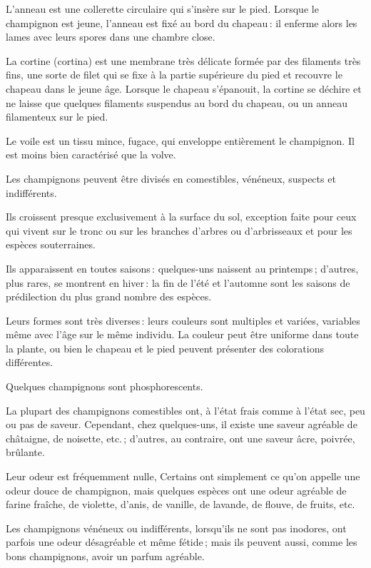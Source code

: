 L'anneau est une collerette circulaire qui s'insère sur le pied. Lorsque le
champignon est jeune, l'anneau est fixé au bord du chapeau : il enferme alors
les lames avec leurs spores dans une chambre close.

La cortine (cortina) est une membrane très délicate formée par des filaments
très fins, une sorte de filet qui se fixe à la partie supérieure du pied et
recouvre le chapeau dans le jeune âge. Lorsque le chapeau s'épanouit, la
cortine se déchire et ne laisse que quelques filaments suspendus au bord du
chapeau, ou un anneau filamenteux sur le pied.

Le voile est un tissu mince, fugace, qui enveloppe entièrement le champignon.
Il est moins bien caractérisé que la volve.

\medskip

Les champignons peuvent être divisés en comestibles, vénéneux, suspects et
indifférents.

Ils croissent presque exclusivement à la surface du sol, exception faite pour
ceux qui vivent sur le tronc ou sur les branches d'arbres ou d'arbrisseaux et
pour les espèces souterraines.

Ils apparaissent en toutes saisons : quelques-uns naissent au printemps ;
d'autres, plus rares, se montrent en hiver : la fin de l'été et l'automne sont
les saisons de prédilection du plus grand nombre des espèces.

Leurs formes sont très diverses : leurs couleurs sont multiples et variées,
variables même avec l’âge sur le même individu. La couleur peut être uniforme
dans toute la plante, ou bien le chapeau et le pied peuvent présenter des
colorations différentes.

Quelques champignons sont phosphorescents.

La plupart des champignons comestibles ont, à l'état frais comme à l’état sec,
peu ou pas de saveur. Cependant, chez quelques-uns, il existe une saveur agréable
de châtaigne, de noisette, etc. ; d'autres, au contraire, ont une saveur âcre,
poivrée, brûlante.

Leur odeur est fréquemment nulle, Certains ont simplement ce qu'on appelle
une odeur douce de champignon, mais quelques espèces ont une odeur agréable
de farine fraîche, de violette, d'anis, de vanille, de lavande, de flouve, de
fruits, etc.

Les champignons vénéneux ou indifférents, lorsqu'ils ne sont pas inodores, ont
parfois une odeur désagréable et même fétide ; mais ils peuvent aussi, comme
les bons champignons, avoir un parfum agréable.

